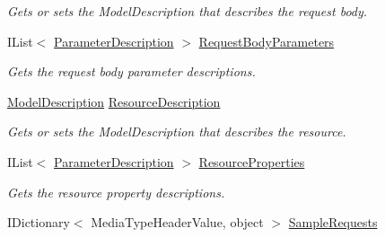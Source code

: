 \begin{DoxyCompactItemize}
\begin{DoxyCompactList}\small\item\em Gets or sets the Model\+Description that describes the request body. \end{DoxyCompactList}\item 
I\+List$<$ \hyperlink{class__1aarsproeve_web_service_1_1_areas_1_1_help_page_1_1_model_descriptions_1_1_parameter_description}{Parameter\+Description} $>$ \hyperlink{class__1aarsproeve_web_service_1_1_areas_1_1_help_page_1_1_models_1_1_help_page_api_model_a01d824c4a2e89f5c4464fc1a077361a6}{Request\+Body\+Parameters}
\begin{DoxyCompactList}\small\item\em Gets the request body parameter descriptions. \end{DoxyCompactList}\item 
\hyperlink{class__1aarsproeve_web_service_1_1_areas_1_1_help_page_1_1_model_descriptions_1_1_model_description}{Model\+Description} \hyperlink{class__1aarsproeve_web_service_1_1_areas_1_1_help_page_1_1_models_1_1_help_page_api_model_a190780aa4262f4e6da85944b57e57307}{Resource\+Description}
\begin{DoxyCompactList}\small\item\em Gets or sets the Model\+Description that describes the resource. \end{DoxyCompactList}\item 
I\+List$<$ \hyperlink{class__1aarsproeve_web_service_1_1_areas_1_1_help_page_1_1_model_descriptions_1_1_parameter_description}{Parameter\+Description} $>$ \hyperlink{class__1aarsproeve_web_service_1_1_areas_1_1_help_page_1_1_models_1_1_help_page_api_model_a9ab05000ce11c2ab4d69f190f2177239}{Resource\+Properties}
\begin{DoxyCompactList}\small\item\em Gets the resource property descriptions. \end{DoxyCompactList}\item 
I\+Dictionary$<$ Media\+Type\+Header\+Value, object $>$ \hyperlink{class__1aarsproeve_web_service_1_1_areas_1_1_help_page_1_1_models_1_1_help_page_api_model_a28948b3477b00b650df4df27d9a1b866}{Sample\+Requests}

\end{DoxyCompactItemize}

